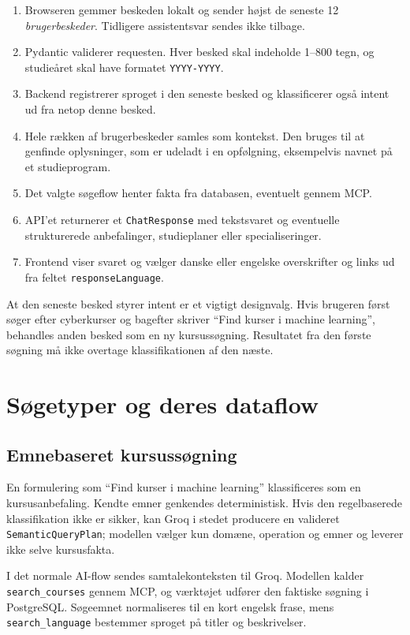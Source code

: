 \documentclass[11pt,a4paper]{article}
\newcommand{\code}[1]{\texttt{#1}}
\begin{document}
\begin{enumerate}
  \item Browseren gemmer beskeden lokalt og sender højst de seneste 12
  \emph{brugerbeskeder}. Tidligere assistentsvar sendes ikke tilbage.
  \item Pydantic validerer requesten. Hver besked skal indeholde 1--800 tegn,
  og studieåret skal have formatet \code{YYYY-YYYY}.
  \item Backend registrerer sproget i den seneste besked og klassificerer
  også intent ud fra netop denne besked.
  \item Hele rækken af brugerbeskeder samles som kontekst. Den bruges til at
  genfinde oplysninger, som er udeladt i en opfølgning, eksempelvis navnet på
  et studieprogram.
  \item Det valgte søgeflow henter fakta fra databasen, eventuelt gennem MCP.
  \item API'et returnerer et \code{ChatResponse} med tekstsvaret og eventuelle
  strukturerede anbefalinger, studieplaner eller specialiseringer.
  \item Frontend viser svaret og vælger danske eller engelske overskrifter og
  links ud fra feltet \code{responseLanguage}.
\end{enumerate}

At den seneste besked styrer intent er et vigtigt designvalg. Hvis brugeren
først søger efter cyberkurser og bagefter skriver ``Find kurser i machine
learning'', behandles anden besked som en ny kursussøgning. Resultatet fra den
første søgning må ikke overtage klassifikationen af den næste.

\section{Søgetyper og deres dataflow}

\subsection{Emnebaseret kursussøgning}

En formulering som ``Find kurser i machine learning'' klassificeres som en
kursusanbefaling. Kendte emner genkendes deterministisk. Hvis den regelbaserede
klassifikation ikke er sikker, kan Groq i stedet producere en valideret
\code{SemanticQueryPlan}; modellen vælger kun domæne, operation og emner og
leverer ikke selve kursusfakta.

I det normale AI-flow sendes samtalekonteksten til Groq. Modellen kalder
\code{search\_courses} gennem MCP, og værktøjet udfører den faktiske søgning i
PostgreSQL. Søgeemnet normaliseres til en kort engelsk frase, mens
\code{search\_language} bestemmer sproget på titler og beskrivelser.
\end{document}
